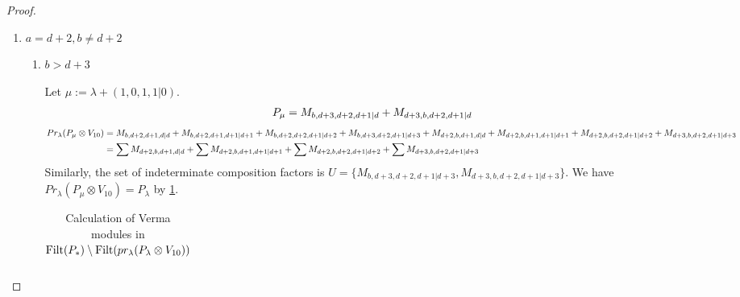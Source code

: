 \begin{proof}
\begin{enumerate}
\begin{enumerate}
\begin{enumerate}
\begin{table}[htbp]
\begin{tabular}{cc}
{ $M_{d+4,a,d+2,d+1|d+4}$,
 $M_{d+2,d+4,a,d+1|d+4}$,
 $M_{d+1,d+4,d+2,a|d+4}$, \\
 $M_{d+4,d+2,a,d+1|d+4}$,
 $M_{d+4,d+1,d+2,a|d+4}$,
 $M_{d+2,d+4,d+1,a|d+4}$,
 $M_{d+4,d+2,d+1,a|d+4}$
}\\
\bottomrule
\end{tabular}
\vspace{0.5em}
\parbox{\linewidth}{\small
\textbf{Interpretation:}
This table displays only selected computational results. This partial presentation does not affect our conclusion.
}
\end{table}
        \end{enumerate}

      \item $a = d+2,b \neq  d+2$ \par
        \begin{enumerate}
          \item $b>d+3$ \par
        Let $\mu:=\lambda + (1,0,1,1|0) $.
        \begin{equation}\notag
          \begin{aligned}
            P_\mu = M_{b,d+3,d+2,d+1|d}
+ M_{d+3,b,d+2,d+1|d}
          \end{aligned}
        \end{equation}
        \begin{equation}\notag
          \begin{aligned}
            Pr_{\lambda}(P_\mu \otimes V_{10}) &=
M_{b,d+2,d+1,d|d}
+ M_{b,d+2,d+1,d+1|d+1}
+ M_{b,d+2,d+2,d+1|d+2}
+ M_{b,d+3,d+2,d+1|d+3}
+ M_{d+2,b,d+1,d|d}
+ M_{d+2,b,d+1,d+1|d+1}
+ M_{d+2,b,d+2,d+1|d+2}
+ M_{d+3,b,d+2,d+1|d+3} \\
                                               &=
\sum M_{d+2,b,d+1,d|d}
+ \sum M_{d+2,b,d+1,d+1|d+1}
+ \sum M_{d+2,b,d+2,d+1|d+2}
+ \sum M_{d+3,b,d+2,d+1|d+3}
          \end{aligned}
        \end{equation}
      Similarly, the set of indeterminate composition factors is $U = \{
M_{b,d+3,d+2,d+1|d+3},
M_{d+3,b,d+2,d+1|d+3}
\}$. We have $Pr_{\lambda}(P_\mu \otimes V_{10}) = P_\lambda  $ by \cref{tab:verma-analysis_41_d_24}.
\begin{table}[htbp]
\centering
\caption{Calculation of Verma modules in $\operatorname{Filt}(P_*) \setminus \operatorname{Filt}(pr_{\lambda}(P_\lambda \otimes V_{10})) $ } \label{tab:verma-analysis_41_d_24}
\begin{tabular}{cc}
\toprule

\end{tabular}
\end{table}
\end{enumerate}
\end{enumerate}
\end{enumerate}
\end{proof}
